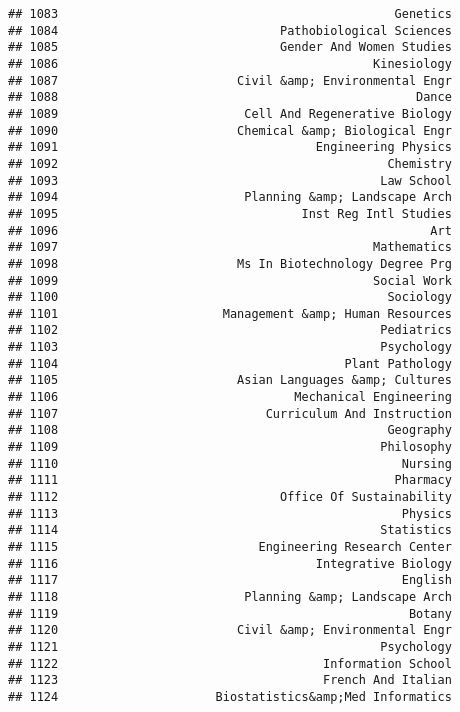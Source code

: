 \documentclass[
]{article}
\begin{document}
\begin{verbatim}
## 1083                                               Genetics
## 1084                               Pathobiological Sciences
## 1085                               Gender And Women Studies
## 1086                                            Kinesiology
## 1087                         Civil &amp; Environmental Engr
## 1088                                                  Dance
## 1089                          Cell And Regenerative Biology
## 1090                         Chemical &amp; Biological Engr
## 1091                                    Engineering Physics
## 1092                                              Chemistry
## 1093                                             Law School
## 1094                          Planning &amp; Landscape Arch
## 1095                                  Inst Reg Intl Studies
## 1096                                                    Art
## 1097                                            Mathematics
## 1098                         Ms In Biotechnology Degree Prg
## 1099                                            Social Work
## 1100                                              Sociology
## 1101                       Management &amp; Human Resources
## 1102                                             Pediatrics
## 1103                                             Psychology
## 1104                                        Plant Pathology
## 1105                         Asian Languages &amp; Cultures
## 1106                                 Mechanical Engineering
## 1107                             Curriculum And Instruction
## 1108                                              Geography
## 1109                                             Philosophy
## 1110                                                Nursing
## 1111                                               Pharmacy
## 1112                               Office Of Sustainability
## 1113                                                Physics
## 1114                                             Statistics
## 1115                            Engineering Research Center
## 1116                                    Integrative Biology
## 1117                                                English
## 1118                          Planning &amp; Landscape Arch
## 1119                                                 Botany
## 1120                         Civil &amp; Environmental Engr
## 1121                                             Psychology
## 1122                                     Information School
## 1123                                     French And Italian
## 1124                      Biostatistics&amp;Med Informatics

\end{verbatim}
\end{document}
